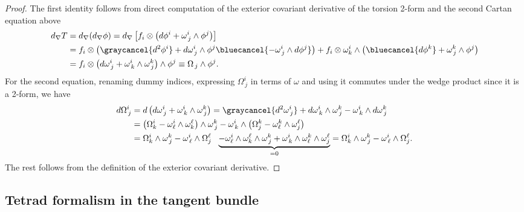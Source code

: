 \begin{proof}
The first identity follows from direct computation of the exterior covariant derivative of the torsion 2-form and the second Cartan equation above
\begin{align}
    d_\nabla T &= d_\nabla (d_\nabla \phi) = d_\nabla \left[f_i\otimes \left(d \phi^i + \omega^i_{\, j} \wedge \phi^j \right)\right]
    \\
    &=
    f_i\otimes \left(\graycancel{d^2 \phi^i} + d\omega^i_{\, j} \wedge \phi^j \bluecancel{- \omega^i_{\, j} \wedge d\phi^j}  \right)
    + f_i \otimes \omega^i_k\wedge \left(\bluecancel{d \phi^k} + \omega^k_{\, j} \wedge \phi^j \right) 
    \\
    &=
    f_i \otimes \left( d\omega^i_{\, j} + \omega^i_{\, k} \wedge \omega^k_{\, j} \right) \wedge \phi^j
    \equiv \Omega_{\, j} \wedge \phi^j.
\end{align}
For the second equation, renaming dummy indices, expressing $\Omega^i_{\, j}$ in terms of $\omega$ and using it commutes under the wedge product since it is a 2-form, we have
\begin{align}
    d \Omega_{\,j}^i &= d \left( d \omega^i_{\, j} + \omega^i_{\, k} \wedge \omega^k_{\, j} \right) = \graycancel{d^2 \omega^i_{\, j}} + d\omega^i_{\, k} \wedge \omega^k_{\, j} - \omega^i_{\, k} \wedge d\omega^k_{\, j}
    \\
    &= \big(\Omega^i_k-\omega^i_\ell\wedge \omega^\ell_k\big)\wedge \omega^k_{\, j} - \omega^i_{\, k} \wedge \big(\Omega_j^k-\omega^k_\ell\wedge \omega^\ell_j\big)
    \\
    & = \Omega^i_k \wedge \omega^k_{\, j} - \omega^i_{\, \ell}\wedge \Omega^\ell_j
    \,\,\,\,\underbrace{-\omega^i_\ell\wedge \omega^\ell_k\wedge \omega^k_{\, j}
    + \omega^i_{\, k} \wedge \omega^k_\ell\wedge \omega^\ell_j}_{=0}
    = \Omega^i_k \wedge \omega^k_{\, j} - \omega^i_{\, \ell}\wedge \Omega^\ell_j.
\end{align}
The rest follows from the definition of the exterior covariant derivative.
\end{proof}






\subsection{Tetrad formalism in the tangent bundle}


